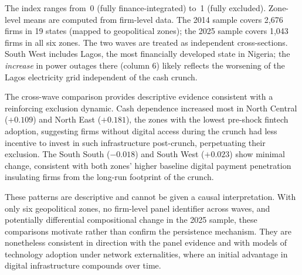 \begin{table}[H]
\begin{threeparttable}
\begin{tablenotes}
  The index ranges from~0 (fully finance-integrated) to~1 (fully
  excluded). Zone-level means are computed from firm-level data.
  The 2014 sample covers 2,676 firms in 19 states (mapped to geopolitical
  zones); the 2025 sample covers 1,043 firms in all six zones.
  The two waves are treated as independent cross-sections.
  South West includes Lagos, the most financially developed state in
  Nigeria; the \emph{increase} in power outages there (column 6)
  likely reflects the worsening of the Lagos electricity grid
  independent of the cash crunch.
\end{tablenotes}
\end{threeparttable}
\end{table}

The cross-wave comparison provides descriptive evidence consistent with a
reinforcing exclusion dynamic. Cash dependence increased most in North
Central ($+0.109$) and North East ($+0.181$), the zones with the lowest
pre-shock fintech adoption, suggesting firms without digital access during
the crunch had less incentive to invest in such infrastructure post-crunch,
perpetuating their exclusion. The South South ($-0.018$) and South West
($+0.023$) show minimal change, consistent with both zones' higher baseline
digital payment penetration insulating firms from the long-run footprint of
the crunch.

These patterns are descriptive and cannot be given a causal interpretation.
With only six geopolitical zones, no firm-level panel identifier across
waves, and potentially differential compositional change in the 2025 sample,
these comparisons motivate rather than confirm the persistence mechanism.
They are nonetheless consistent in direction with the \NLPS{} panel evidence
and with models of technology adoption under network externalities, where an
initial advantage in digital infrastructure compounds over time.
